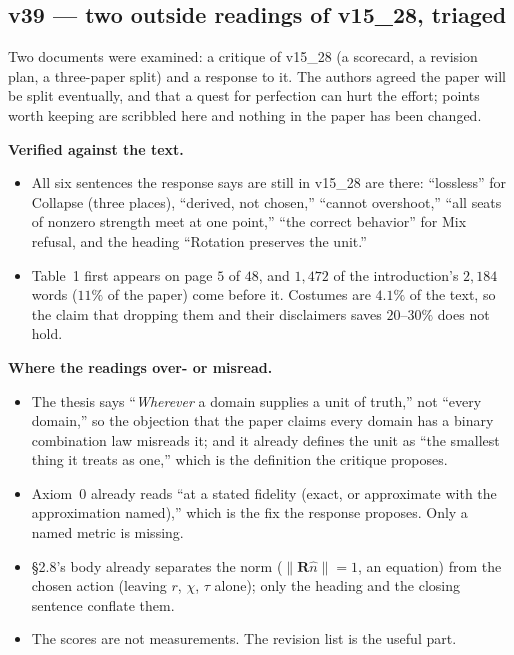 \documentclass[11pt]{article}
\begin{document}
\subsection*{v39 --- two outside readings of v15\_28, triaged}
Two documents were examined: a critique of v15\_28 (a scorecard, a revision plan, a three-paper split) and a response to it. The authors agreed the
paper will be split eventually, and that a quest for perfection can hurt the effort; points worth keeping are scribbled here
and nothing in the paper has been changed.

\textbf{Verified against the text.}
\begin{itemize}
\item All six sentences the response says are still in v15\_28 are there: ``lossless'' for Collapse (three places),
``derived, not chosen,'' ``cannot overshoot,'' ``all seats of nonzero strength meet at one point,'' ``the correct behavior''
for Mix refusal, and the heading ``Rotation preserves the unit.''
\item Table~1 first appears on page $5$ of $48$, and $1{,}472$ of the introduction's $2{,}184$ words ($11\%$ of the paper)
come before it. Costumes are $4.1\%$ of the text, so the claim that dropping them and their disclaimers saves $20$--$30\%$ does not hold.
\end{itemize}

\textbf{Where the readings over- or misread.}
\begin{itemize}
\item The thesis says ``\emph{Wherever} a domain supplies a unit of truth,'' not ``every domain,'' so the objection that the paper claims every
domain has a binary combination law misreads it; and it already defines the unit as ``the smallest thing it treats as one,'' which is the definition
the critique proposes.
\item Axiom~0 already reads ``at a stated fidelity (exact, or approximate with the approximation named),'' which is the fix the response proposes. Only a
named metric is missing.
\item \S2.8's body already separates the norm ($\lVert\mathbf R\hat n\rVert=1$, an equation) from the chosen action (leaving $r$, $\chi$, $\tau$ alone);
only the heading and the closing sentence conflate them.
\item The scores are not measurements. The revision list is the useful part.
\end{itemize}
\end{document}
